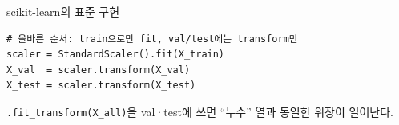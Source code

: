 \begin{frame}[fragile]{scikit-learn의 표준 구현}
\begin{lstlisting}
# 올바른 순서: train으로만 fit, val/test에는 transform만
scaler = StandardScaler().fit(X_train)
X_val  = scaler.transform(X_val)
X_test = scaler.transform(X_test)
\end{lstlisting}
  {\footnotesize \texttt{.fit\_transform(X\_all)}을 val·test에 쓰면
  ``누수'' 열과 동일한 위장이 일어난다.}
\end{frame}
